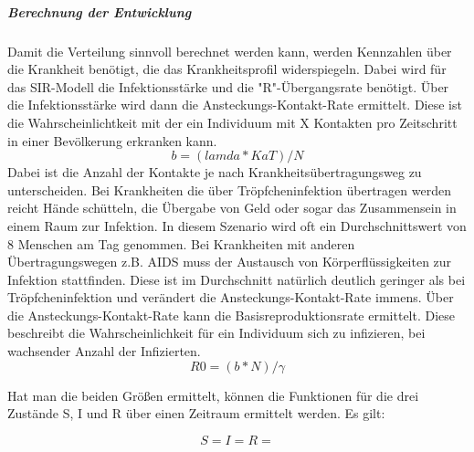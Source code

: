 \subparagraph{Berechnung der Entwicklung}
Damit die Verteilung sinnvoll berechnet werden kann, werden Kennzahlen über die Krankheit benötigt, die das Krankheitsprofil widerspiegeln. Dabei wird für das SIR-Modell die Infektionsstärke und die "R"-Übergangsrate benötigt.
Über die Infektionsstärke wird dann die Ansteckungs-Kontakt-Rate ermittelt. Diese ist die Wahrscheinlichtkeit mit der ein Individuum mit X Kontakten pro Zeitschritt in einer Bevölkerung erkranken kann.
\begin{equation}
b = (lamda * KaT) / N
\end{equation}
Dabei ist die Anzahl der Kontakte je nach Krankheitsübertragungsweg zu unterscheiden. Bei Krankheiten die über Tröpfcheninfektion übertragen werden reicht Hände schütteln, die Übergabe von Geld oder sogar das Zusammensein in einem Raum zur Infektion. In diesem Szenario wird oft ein Durchschnittswert von 8 Menschen am Tag genommen. Bei Krankheiten mit anderen Übertragungswegen z.B. AIDS muss der Austausch von Körperflüssigkeiten zur Infektion stattfinden. Diese ist im Durchschnitt natürlich deutlich geringer als bei Tröpfcheninfektion und verändert die Ansteckungs-Kontakt-Rate immens.
Über die Ansteckungs-Kontakt-Rate kann die Basisreproduktionsrate ermittelt. Diese beschreibt die Wahrscheinlichkeit für ein Individuum sich zu infizieren, bei wachsender Anzahl der Infizierten.
\begin{equation}
R0 = ( b * N ) / γ
\end{equation}

Hat man die beiden Größen ermittelt, können die Funktionen für die drei Zustände S, I und R über einen Zeitraum ermittelt werden. 
Es gilt:

\begin{equation}
S = 

I =

R = 

\end{equation}

